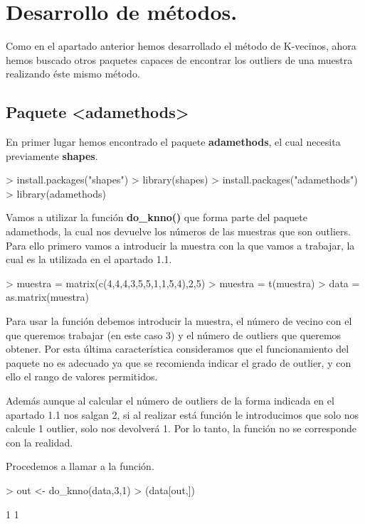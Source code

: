 \documentclass [a4paper] {article}
\begin{document}
\bigskip
\section{Desarrollo de métodos.}
\bigskip
Como en el apartado anterior hemos desarrollado el método de K-vecinos, ahora hemos buscado
otros paquetes capaces de encontrar los outliers de una muestra realizando éste mismo método.
\subsection{Paquete <adamethods>}
\bigskip
En primer lugar hemos encontrado el paquete \textbf{adamethods}, el cual necesita previamente
\textbf{shapes}.
\begin{Schunk}
\begin{Sinput}
> install.packages("shapes")
> library(shapes)
> install.packages("adamethods")
> library(adamethods)
\end{Sinput}
\end{Schunk}
\bigskip
Vamos a utilizar la función \textbf{do\_knno()} que forma parte del paquete adamethods, la cual
nos devuelve los números de las muestras que son outliers. Para ello primero vamos a introducir
la muestra con la que vamos a trabajar, la cual es la utilizada en el apartado 1.1.
\begin{Schunk}
\begin{Sinput}
> muestra = matrix(c(4,4,4,3,5,5,1,1,5,4),2,5)
> muestra = t(muestra)
> data = as.matrix(muestra)
\end{Sinput}
\end{Schunk}
\bigskip
Para usar la función debemos introducir la muestra, el número de vecino con el que queremos trabajar
(en este caso 3) y el número de outliers que queremos obtener. Por esta última característica 
consideramos que el funcionamiento del paquete no es adecuado ya que se recomienda indicar el grado
de outlier, y con ello el rango de valores permitidos.

\bigskip
Además aunque al calcular el número de outliers de la forma indicada en el apartado 1.1 nos salgan 2,
si al realizar está función le introducimos que solo nos calcule 1 outlier, solo nos devolverá 1.
Por lo tanto, la función no se corresponde con la realidad.

\bigskip
Procedemos a llamar a la función.
\begin{Schunk}
\begin{Sinput}
> out <- do_knno(data,3,1)
> (data[out,])
\end{Sinput}
\begin{Soutput}
[1] 1 1
\end{Soutput}
\end{Schunk}
\end{document}
